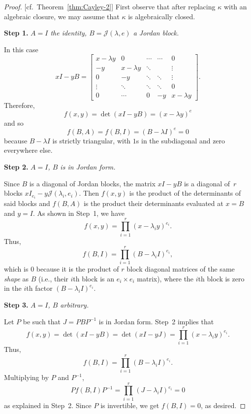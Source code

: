 \begin{proof} {[cf.~Theorem~\ref{thm:Cayley-2}]}
    First observe that after replacing $\kappa$ with an algebraic closure, we may assume that $\kappa$ is algebraically closed.
    
    \textbf{Step 1.} \textit{$A=I$ the identity, $B=\mathcal J(\lambda,e)$ a Jordan block.}
    
    In this case
    $$
        xI-yB = \begin{bmatrix}
                x-\lambda y & 0 & \cdots & \cdots & 0 \\
                -y & x-\lambda y & \ddots &  & \vdots \\
                0 & -y & \ddots & \ddots & \vdots \\
                \vdots & \ddots & \ddots & \ddots & 0 \\
                0 & \cdots & 0 & -y & x-\lambda y
            \end{bmatrix}.
    $$
    Therefore,
    $$
        f(x,y)=\det(xI-yB)=(x-\lambda y)^e
    $$
    and so
    $$
        f(B,A) = f(B,I) = (B-\lambda I)^e = 0
    $$
    because $B-\lambda I$ is strictly triangular, with $1$s in the subdiagonal and zero everywhere else.
    
    \textbf{Step 2.} \textit{$A=I$, $B$ is in Jordan form.} 
    
    Since $B$ is a diagonal of Jordan blocks, the matrix $xI-yB$ is a diagonal of~$r$ blocks $xI_{e_i}-y\mathcal J(\lambda_i,e_i)$. Then $f(x,y)$ is the product of the determinants of said blocks and $f(B,A)$ is the product their determinants evaluated at $x=B$ and $y=I$. As shown in Step~1, we have
    $$
        f(x,y)=\prod_{i=1}^r(x-\lambda_i y)^{e_i}.
    $$
    Thus,
    $$
        f(B,I) = \prod_{i=1}^r(B-\lambda_iI)^{e_i},
    $$
    which is $0$ because it is the product of $r$ block diagonal matrices of the same \textit{shape} as $B$ (i.e., their $i$th block is an $e_i\times e_i$ matrix), where the $i$th block is zero in the $i$th factor $(B-\lambda_iI)^{e_i}$.

    \textbf{Step 3.} \textit{$A=I$, $B$ arbitrary.}

    Let $P$ be such that $J=PBP^{-1}$ is in Jordan form. Step~2 implies that
    $$
        f(x,y) = \det(xI-yB)
            = \det(xI-yJ)=
            \prod_{i=1}^r(x-\lambda_i y)^{e_i}.
    $$
    Thus,
    $$
        f(B,I) = \prod_{i=1}^r(B-\lambda_iI)^{e_i}.
    $$
    Multiplying by $P$ and $P^{-1}$,
    $$
        Pf(B,I)P^{-1}=\prod_{i=1}^r(J-\lambda_iI)^{e_i}=0
    $$
    as explained in Step~2. Since $P$ is invertible, we get $f(B,I)=0$, as desired.


\end{proof}
